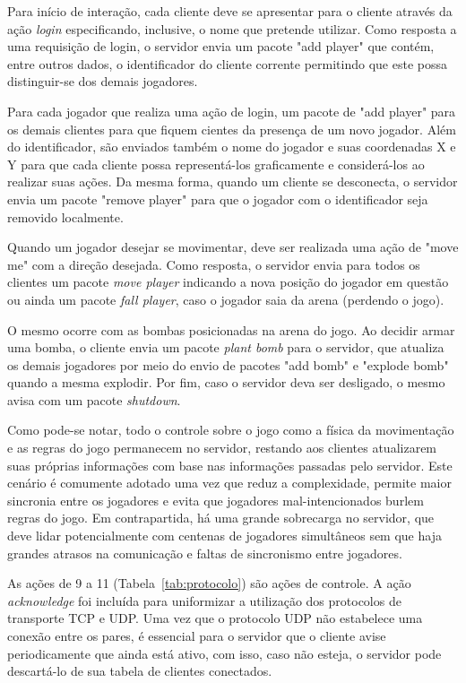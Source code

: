 \documentclass[12pt]{article}
\begin{document}
Para início de interação, cada cliente deve se apresentar para o cliente
através da ação \textit{login} especificando, inclusive, o nome que pretende
utilizar. Como resposta a uma requisição de login, o servidor envia um pacote
"add player" que contém, entre outros dados, o identificador do cliente
corrente permitindo que este possa distinguir-se dos demais jogadores.

Para cada jogador que realiza uma ação de login, um pacote de "add player" para
os demais clientes para que fiquem cientes da presença de um novo jogador. Além
do identificador, são enviados também o nome do jogador e suas coordenadas X e
Y para que cada cliente possa representá-los graficamente e considerá-los ao
realizar suas ações. Da mesma forma, quando um cliente se desconecta, o
servidor envia um pacote "remove player" para que o jogador com o identificador
seja removido localmente.

Quando um jogador desejar se movimentar, deve ser realizada uma ação de "move
me" com a direção desejada. Como resposta, o servidor envia para todos os
clientes um pacote \textit{move player} indicando a nova posição do jogador em
questão ou ainda um pacote \textit{fall player}, caso o jogador saia da arena
(perdendo o jogo).

O mesmo ocorre com as bombas posicionadas na arena do jogo. Ao decidir armar
uma bomba, o cliente envia um pacote \textit{plant bomb} para o servidor, que
atualiza os demais jogadores por meio do envio de pacotes "add bomb" e "explode
bomb" quando a mesma explodir. Por fim, caso o servidor deva ser desligado, o
mesmo avisa com um pacote \textit{shutdown}.

Como pode-se notar, todo o controle sobre o jogo como a física da movimentação
e as regras do jogo permanecem no servidor, restando aos clientes atualizarem
suas próprias informações com base nas informações passadas pelo servidor. Este
cenário é comumente adotado uma vez que reduz a complexidade, permite maior
sincronia entre os jogadores e evita que jogadores mal-intencionados burlem
regras do jogo. Em contrapartida, há uma grande sobrecarga no servidor, que
deve lidar potencialmente com centenas de jogadores simultâneos sem que haja
grandes atrasos na comunicação e faltas de sincronismo entre jogadores.

As ações de 9 a 11 (Tabela~\ref{tab:protocolo}) são ações de controle. A ação
\textit{acknowledge} foi incluída para uniformizar a utilização dos protocolos
de transporte TCP e UDP. Uma vez que o protocolo UDP não estabelece uma
conexão entre os pares, é essencial para o servidor que o cliente avise
periodicamente que ainda está ativo, com isso, caso não esteja, o servidor pode
descartá-lo de sua tabela de clientes conectados.
\end{document}
